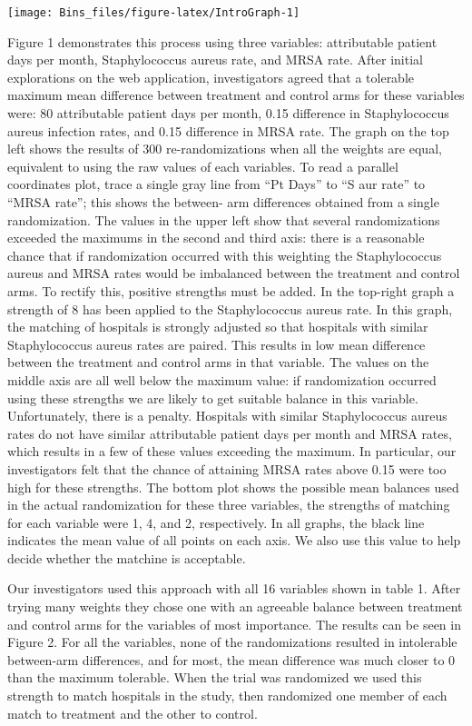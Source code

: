 \documentclass[]{article}
\begin{document}
\begin{center}\texttt{[image: Bins\_files/figure-latex/IntroGraph-1]} \end{center}

Figure 1 demonstrates this process using three variables: attributable
patient days per month, Staphylococcus aureus rate, and MRSA rate. After
initial explorations on the web application, investigators agreed that a
tolerable maximum mean difference between treatment and control arms for
these variables were: 80 attributable patient days per month, 0.15
difference in Staphylococcus aureus infection rates, and 0.15 difference
in MRSA rate. The graph on the top left shows the results of 300
re-randomizations when all the weights are equal, equivalent to using
the raw values of each variables. To read a parallel coordinates plot,
trace a single gray line from ``Pt Days'' to ``S aur rate'' to ``MRSA
rate''; this shows the between- arm differences obtained from a single
randomization. The values in the upper left show that several
randomizations exceeded the maximums in the second and third axis: there
is a reasonable chance that if randomization occurred with this
weighting the Staphylococcus aureus and MRSA rates would be imbalanced
between the treatment and control arms. To rectify this, positive
strengths must be added. In the top-right graph a strength of 8 has been
applied to the Staphylococcus aureus rate. In this graph, the matching
of hospitals is strongly adjusted so that hospitals with similar
Staphylococcus aureus rates are paired. This results in low mean
difference between the treatment and control arms in that variable. The
values on the middle axis are all well below the maximum value: if
randomization occurred using these strengths we are likely to get
suitable balance in this variable. Unfortunately, there is a penalty.
Hospitals with similar Staphylococcus aureus rates do not have similar
attributable patient days per month and MRSA rates, which results in a
few of these values exceeding the maximum. In particular, our
investigators felt that the chance of attaining MRSA rates above 0.15
were too high for these strengths. The bottom plot shows the possible
mean balances used in the actual randomization for these three
variables, the strengths of matching for each variable were 1, 4, and 2,
respectively. In all graphs, the black line indicates the mean value of
all points on each axis. We also use this value to help decide whether
the matchine is acceptable.

Our investigators used this approach with all 16 variables shown in
table 1. After trying many weights they chose one with an agreeable
balance between treatment and control arms for the variables of most
importance. The results can be seen in Figure 2. For all the variables,
none of the randomizations resulted in intolerable between-arm
differences, and for most, the mean difference was much closer to 0 than
the maximum tolerable. When the trial was randomized we used this
strength to match hospitals in the study, then randomized one member of
each match to treatment and the other to control.
\end{document}
